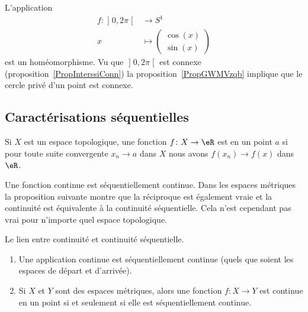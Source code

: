 \begin{example} \label{EXooJFDPooBZADKs}
    L'application
    \begin{equation}
        \begin{aligned}
            f\colon \mathopen] 0 , 2\pi \mathclose[&\to S^1 \\
                x&\mapsto \begin{pmatrix}
                    \cos(x)    \\
                    \sin(x)
                \end{pmatrix}
        \end{aligned}
    \end{equation}
    est un homéomorphisme. Vu que \( \mathopen] 0 , 2\pi \mathclose[\) est connexe (proposition~\ref{PropInterssiConn}) la proposition~\ref{PropGWMVzqb} implique que le cercle privé d'un point est connexe.
\end{example}

\subsection{Caractérisations séquentielles}

\begin{definition}  \label{DefENioICV}
    Si \( X\) est un espace topologique, une fonction \( f\colon X\to \eR\) est  en un point \( a\) si pour toute suite convergente \( x_n\to a\) dans \( X\) nous avons \( f(x_n)\to f(x)\) dans \( \eR\).
\end{definition}


Une fonction continue est séquentiellement continue. Dans les espaces métriques la proposition suivante montre que la réciproque est également vraie et la continuité est équivalente à la continuité séquentielle. Cela n'est cependant pas vrai pour n'importe quel espace topologique.

\begin{proposition}		\label{PropFnContParSuite}
    Le lien entre continuité et continuité séquentielle.

    \begin{enumerate}
        \item
    Une application continue est séquentiellement continue (quels que soient les espaces de départ et d'arrivée).

\item\label{ItemWJHIooMdugfu}

    Si \( X\) et \( Y\) sont des espaces métriques, alors une fonction \( f\colon X\to Y\) est continue en un point si et seulement si elle est séquentiellement continue.
    \end{enumerate}
\end{proposition}

